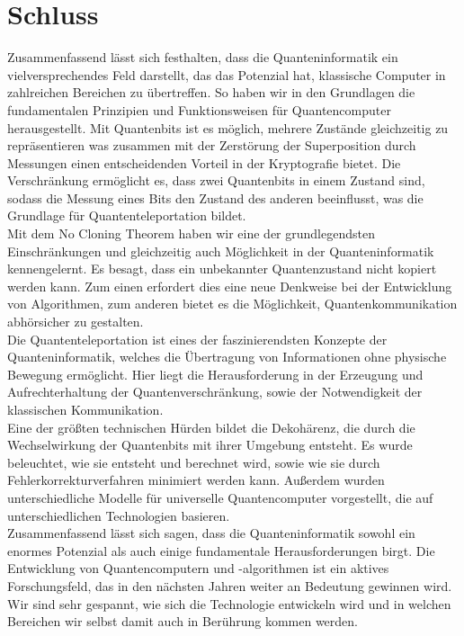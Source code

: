 \section{Schluss}
\label{sec:schluss}

Zusammenfassend lässt sich festhalten, dass die Quanteninformatik ein vielversprechendes Feld darstellt, das das Potenzial hat, klassische Computer in zahlreichen Bereichen zu übertreffen.
So haben wir in den Grundlagen die fundamentalen Prinzipien und Funktionsweisen für Quantencomputer herausgestellt.
Mit Quantenbits ist es möglich, mehrere Zustände gleichzeitig zu repräsentieren was zusammen mit der Zerstörung der Superposition durch Messungen einen entscheidenden Vorteil in der Kryptografie bietet.
Die Verschränkung ermöglicht es, dass zwei Quantenbits in einem Zustand sind, sodass die Messung eines Bits den Zustand des anderen beeinflusst, was die Grundlage für Quantenteleportation bildet.\\

Mit dem No Cloning Theorem haben wir eine der grundlegendsten Einschränkungen und gleichzeitig auch Möglichkeit in der Quanteninformatik kennengelernt.
Es besagt, dass ein unbekannter Quantenzustand nicht kopiert werden kann.
Zum einen erfordert dies eine neue Denkweise bei der Entwicklung von Algorithmen, zum anderen bietet es die Möglichkeit, Quantenkommunikation abhörsicher zu gestalten.\\

Die Quantenteleportation ist eines der faszinierendsten Konzepte der Quanteninformatik, welches die Übertragung von Informationen ohne physische Bewegung ermöglicht.
Hier liegt die Herausforderung in der Erzeugung und Aufrechterhaltung der Quantenverschränkung, sowie der Notwendigkeit der klassischen Kommunikation.\\

Eine der größten technischen Hürden bildet die Dekohärenz, die durch die Wechselwirkung der Quantenbits mit ihrer Umgebung entsteht.
Es wurde beleuchtet, wie sie entsteht und berechnet wird, sowie wie sie durch Fehlerkorrekturverfahren minimiert werden kann.
Außerdem wurden unterschiedliche Modelle für universelle Quantencomputer vorgestellt, die auf unterschiedlichen Technologien basieren.\\

Zusammenfassend lässt sich sagen, dass die Quanteninformatik sowohl ein enormes Potenzial als auch einige fundamentale Herausforderungen birgt.
Die Entwicklung von Quantencomputern und -algorithmen ist ein aktives Forschungsfeld, das in den nächsten Jahren weiter an Bedeutung gewinnen wird.
Wir sind sehr gespannt, wie sich die Technologie entwickeln wird und in welchen Bereichen wir selbst damit auch in Berührung kommen werden.









